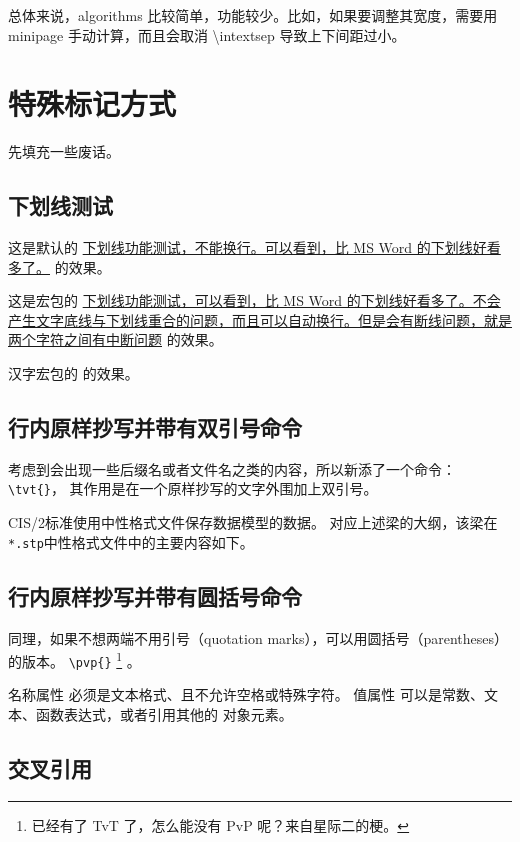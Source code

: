 \documentclass[../Main/thesis]{subfiles}
\begin{document}
总体来说，algorithms 比较简单，功能较少。比如，如果要调整其宽度，需要用 minipage 手动计算，而且会取消 \textbackslash intextsep 导致上下间距过小。

\section{特殊标记方式}
\label{sec:mark-methods}

先填充一些废话。\zhlipsum[9]

\subsection{下划线测试}
\label{ssc:underline}

这是默认的 \underline{下划线功能测试，不能换行。可以看到，比 MS Word 的下划线好看多了。} 的效果。

这是宏包的 \uline{下划线功能测试，可以看到，比 MS Word 的下划线好看多了。不会产生文字底线与下划线重合的问题，而且可以自动换行。但是会有断线问题，就是两个字符之间有中断问题} 的效果。

汉字宏包的  的效果。

\subsection{行内原样抄写并带有双引号命令}
\label{ssc:tvt}

考虑到会出现一些后缀名或者文件名之类的内容，所以新添了一个命令：
\verb|\tvt{}|，
其作用是在一个原样抄写的文字外围加上双引号。

CIS/2标准使用中性格式文件保存数据模型的数据。
对应上述梁的大纲，该梁在\texttt{*.stp}中性格式文件中的主要内容如下。

\subsection{行内原样抄写并带有圆括号命令}
\label{ssc:pvp}

同理，如果不想两端不用引号（quotation marks），可以用圆括号（parentheses）的版本。
\verb|\pvp{}|
\footnote{已经有了 TvT 了，怎么能没有 PvP 呢？来自星际二的梗。}
。

名称属性  必须是文本格式、且不允许空格或特殊字符。
值属性  可以是常数、文本、函数表达式，或者引用其他的 对象元素。

\subsection{交叉引用}
\label{ssc:cross-ref-cmd}
\end{document}
